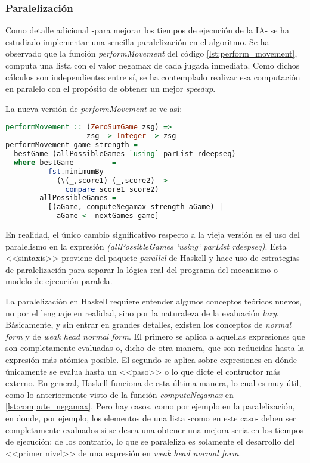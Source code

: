 \documentclass{llncs}
\begin{document}
\subsubsection{ Paralelización }

Como detalle adicional -para mejorar los tiempos de ejecución de la IA- se ha estudiado implementar una sencilla paralelización en el algoritmo. Se ha observado que la función \textit{performMovement} del código \ref{lst:perform_movement}, computa una lista con el valor negamax de cada jugada inmediata. Como dichos cálculos son independientes entre sí, se ha contemplado realizar esa computación en paralelo con el propósito de obtener un mejor \textit{speedup}.

La nueva versión de \textit{performMovement} se ve así:

\begin{lstlisting}[frame=single, language=haskell, captionpos=b, caption=Definición paralela de performMovement]
performMovement :: (ZeroSumGame zsg) =>
                   zsg -> Integer -> zsg
performMovement game strength =
  bestGame (allPossibleGames `using` parList rdeepseq)
  where bestGame         =
          fst.minimumBy
            (\(_,score1) (_,score2) ->
              compare score1 score2)
        allPossibleGames =
          [(aGame, computeNegamax strength aGame) |
            aGame <- nextGames game]
\end{lstlisting}

En realidad, el único cambio significativo respecto a la vieja versión es el uso del paralelismo en la expresión \textit{(allPossibleGames `using` parList rdeepseq)}. Esta <<sintaxis>> proviene del paquete \textit{parallel} de Haskell y hace uso de estrategias de paralelización para separar la lógica real del programa del mecanismo o modelo de ejecución paralela.

La paralelización en Haskell requiere entender algunos conceptos teóricos nuevos, no por el lenguaje en realidad, sino por la naturaleza de la evaluación \textit{lazy}. Básicamente, y sin entrar en grandes detalles, existen los conceptos de \textit{normal form} y de  \textit{weak head normal form}. El primero se aplica a aquellas expresiones que son completamente evaluadas o, dicho de otra manera, que son reducidas hasta la expresión más atómica posible. El segundo se aplica sobre expresiones en dónde únicamente se evalua hasta un <<paso>> o lo que dicte el contructor más externo. En general, Haskell funciona de esta última manera, lo cual es muy útil, como lo anteriormente visto de la función \textit{computeNegamax} en \ref{lst:compute_negamax}. Pero hay casos, como por ejemplo en la paralelización, en donde, por ejemplo, los elementos de una lista -como en este caso- deben ser completamente evaluados si se desea una obtener una mejora seria en los tiempos de ejecución; de los contrario, lo que se paraleliza es solamente el desarrollo del <<primer nivel>> de una expresión en \textit{weak head normal form}.
\end{document}
